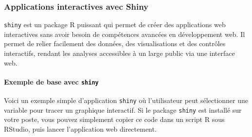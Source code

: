 \documentclass[
  letterpaper,
  DIV=11,
  numbers=noendperiod]{scrreprt}
\let\oldparagraph\paragraph
\renewcommand{\paragraph}[1]{\oldparagraph{#1}\mbox{}}
\begin{document}
\hypertarget{applications-interactives-avec-shiny}{%
\subsubsection{Applications interactives avec
Shiny}\label{applications-interactives-avec-shiny}}

\texttt{shiny} est un package R puissant qui permet de créer des
applications web interactives sans avoir besoin de compétences avancées
en développement web. Il permet de relier facilement des données, des
visualisations et des contrôles interactifs, rendant les analyses
accessibles à un large public via une interface web.

\hypertarget{exemple-de-base-avec-shiny}{%
\paragraph{\texorpdfstring{Exemple de base avec
\texttt{shiny}}{Exemple de base avec shiny}}\label{exemple-de-base-avec-shiny}}

Voici un exemple simple d'application \texttt{shiny} où l'utilisateur
peut sélectionner une variable pour tracer un graphique interactif. Si
le package \texttt{shiny} est installé sur votre poste, vous pouvez
simplement copier ce code dans un script R sous RStudio, puis lancer
l'application web directement.
\end{document}
